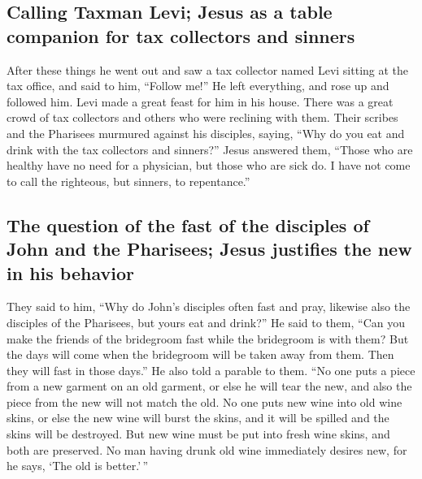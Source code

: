 \hypertarget{calling-taxman-levi-jesus-as-a-table-companion-for-tax-collectors-and-sinners}{%
\subsection{Calling Taxman Levi; Jesus as a table companion for tax
collectors and
sinners}\label{calling-taxman-levi-jesus-as-a-table-companion-for-tax-collectors-and-sinners}}

 After these things he went out and saw a tax collector
named Levi sitting at the tax office, and said to him, ``Follow me!''
 He left everything, and rose up and followed him.
 Levi made a great feast for him in his house. There was
a great crowd of tax collectors and others who were reclining with them.
 Their scribes and the Pharisees murmured against his
disciples, saying, ``Why do you eat and drink with the tax collectors
and sinners?''  Jesus answered them, ``Those who are
healthy have no need for a physician, but those who are sick do.
 I have not come to call the righteous, but sinners, to
repentance.''

\hypertarget{the-question-of-the-fast-of-the-disciples-of-john-and-the-pharisees-jesus-justifies-the-new-in-his-behavior}{%
\subsection{The question of the fast of the disciples of John and the
Pharisees; Jesus justifies the new in his
behavior}\label{the-question-of-the-fast-of-the-disciples-of-john-and-the-pharisees-jesus-justifies-the-new-in-his-behavior}}

 They said to him, ``Why do John's disciples often fast
and pray, likewise also the disciples of the Pharisees, but yours eat
and drink?''  He said to them, ``Can you make the friends
of the bridegroom fast while the bridegroom is with them?
 But the days will come when the bridegroom will be taken
away from them. Then they will fast in those days.''  He
also told a parable to them. ``No one puts a piece from a new garment on
an old garment, or else he will tear the new, and also the piece from
the new will not match the old.  No one puts new wine
into old wine skins, or else the new wine will burst the skins, and it
will be spilled and the skins will be destroyed.  But new
wine must be put into fresh wine skins, and both are preserved.
 No man having drunk old wine immediately desires new,
for he says, `The old is better.'\,''

